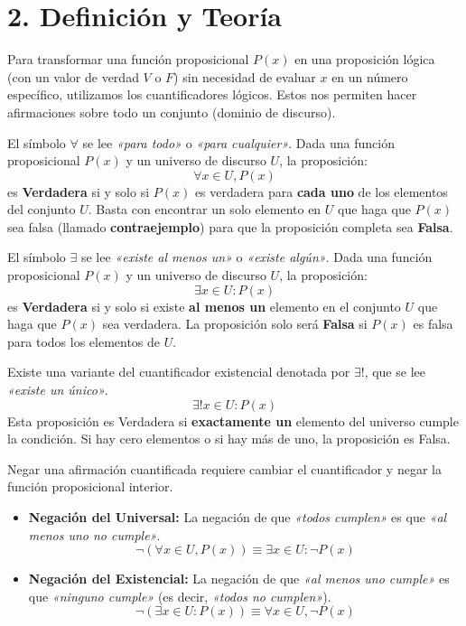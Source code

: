 \documentclass[11pt]{article}
\newenvironment{teoria}{\section*{2. Definición y Teoría}}{}
\newenvironment{definicion}[1]{\begin{tcolorbox}[colback=blue!5,colframe=blue!75!black,title=Definición: #1]}{\end{tcolorbox}}
\newenvironment{teorema}[1]{\begin{tcolorbox}[colback=green!5,colframe=green!75!black,title=Teorema: #1]}{\end{tcolorbox}}
\newenvironment{alerta}[1]{\begin{tcolorbox}[colback=yellow!5,colframe=yellow!75!black,title=Alerta: #1]}{\end{tcolorbox}}
\begin{document}
\begin{teoria}
  Para transformar una función proposicional $P(x)$ en una proposición lógica (con un valor de verdad $V$ o $F$) sin necesidad de evaluar $x$ en un número específico, utilizamos los cuantificadores lógicos. Estos nos permiten hacer afirmaciones sobre todo un conjunto (dominio de discurso).

  \begin{definicion}{Cuantificador Universal ($\forall$)}
    El símbolo $\forall$ se lee \textit{«para todo»} o \textit{«para cualquier»}. Dada una función proposicional $P(x)$ y un universo de discurso $U$, la proposición:
    \[ \forall x \in U, P(x) \]
    es \textbf{Verdadera} si y solo si $P(x)$ es verdadera para \textbf{cada uno} de los elementos del conjunto $U$.
    Basta con encontrar un solo elemento en $U$ que haga que $P(x)$ sea falsa (llamado \textbf{contraejemplo}) para que la proposición completa sea \textbf{Falsa}.
  \end{definicion}

  \begin{definicion}{Cuantificador Existencial ($\exists$)}
    El símbolo $\exists$ se lee \textit{«existe al menos un»} o \textit{«existe algún»}. Dada una función proposicional $P(x)$ y un universo de discurso $U$, la proposición:
    \[ \exists x \in U : P(x) \]
    es \textbf{Verdadera} si y solo si existe \textbf{al menos un} elemento en el conjunto $U$ que haga que $P(x)$ sea verdadera.
    La proposición solo será \textbf{Falsa} si $P(x)$ es falsa para todos los elementos de $U$.
  \end{definicion}

  \begin{alerta}{El Cuantificador Existencial Único ($\exists!$)}
    Existe una variante del cuantificador existencial denotada por $\exists!$, que se lee \textit{«existe un único»}. 
    \[ \exists! x \in U : P(x) \]
    Esta proposición es Verdadera si \textbf{exactamente un} elemento del universo cumple la condición. Si hay cero elementos o si hay más de uno, la proposición es Falsa.
  \end{alerta}

  \begin{teorema}{Negación de Cuantificadores (Leyes de De Morgan Generalizadas)}
    Negar una afirmación cuantificada requiere cambiar el cuantificador y negar la función proposicional interior.
    \begin{itemize}
        \item \textbf{Negación del Universal:} La negación de que \textit{«todos cumplen»} es que \textit{«al menos uno no cumple»}.
        \[ \neg (\forall x \in U, P(x)) \equiv \exists x \in U : \neg P(x) \]
        \item \textbf{Negación del Existencial:} La negación de que \textit{«al menos uno cumple»} es que \textit{«ninguno cumple»} (es decir, \textit{«todos no cumplen»}).
        \[ \neg (\exists x \in U : P(x)) \equiv \forall x \in U, \neg P(x) \]
    \end{itemize}
  \end{teorema}


\end{teoria}
\end{document}
